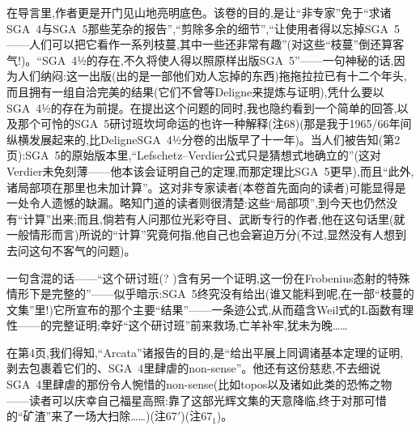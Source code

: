 \pmark {}在导言里,作者更是开门见山地亮明底色。该卷的目的,是让“非专家”免于“求诸SGA~4与SGA~5那些芜杂的报告”,“剪除多余的细节”,“让使用者得以忘掉SGA~5——人们可以把它看作一系列枝蔓,其中一些还非常有趣”(对这些“枝蔓”倒还算客气!)。“SGA~4½的存在,不久将使人得以照原样出版SGA~5”——一句神秘的话,因为人们纳闷:这一出版(出的是一部他们劝人忘掉的东西)拖拖拉拉已有十二个年头,而且拥有一组自洽完美的结果(它们不曾等Deligne来提炼与证明),凭什么要以SGA~4½的存在为前提。在提出这个问题的同时,我也隐约看到一个简单的回答,以及那个可怜的SGA~5研讨班坎坷命运的也许一种解释(注68)(那是我于1965/66年间纵横发展起来的,比DeligneSGA~4½分卷的出版早了十一年)。当人们被告知(第2页):SGA~5的原始版本里,“Lefschetz--Verdier公式只是猜想式地确立的”(这对Verdier未免刻薄——他本该会证明自己的定理,而那定理比SGA~5更早),而且“此外,诸局部项在那里也未加计算”。这对非专家读者(本卷首先面向的读者)可能显得是一处令人遗憾的缺漏。略知门道的读者则很清楚:这些“局部项”,到今天也仍然没有“计算”出来;而且,倘若有人问那位光彩夺目、武断专行的作者,他在这句话里(就一般情形而言)所说的“计算”究竟何指,他自己也会窘迫万分(不过,显然没有人想到去问这句不客气的问题)。

一句含混的话——“这个研讨班(? )含有\dmark{}另一个证明,这一份在Frobenius态射的特殊情形下是完整的”——似乎暗示:SGA~5终究没有给出(谁又能料到呢,在一部“枝蔓的文集”里!)它所宣布的那个主要“结果”——一条迹公式,从而蕴含Weil式的L函数有理性——的完整证明;幸好“这个研讨班”前来救场,亡羊补牢,犹未为晚……

在第4页,我们得知,“Arcata”诸报告的目的,是“给出平展上同调诸基本定理的证明,剥去包裹着它们的、SGA~4里肆虐的non-sense”。他还有这份慈悲,不去细说SGA~4里肆虐的那份令人惋惜的non-sense(比如topos以及诸如此类的恐怖之物——读者可以庆幸自己福星高照:靠了这部光辉文集的天意降临,终于对那可惜的“矿渣”来了一场大扫除……)(注67$'$)(注67$_{1}$)。

